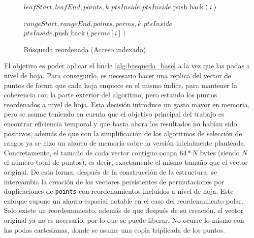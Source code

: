 \begin{figure}[H]
\centering
\begin{minipage}{0.47\textwidth}
\begin{algorithmic}[1]
\Require $\mathit{leafStart}, \mathit{leafEnd}, \mathit{points}, k$
\Ensure $\mathit{ptsInside}$
\Statex
{}
        \State $\mathit{ptsInside}.\text{push\_back}(i)$
    \EndIf
\EndFor
\end{algorithmic}
\caption{Búsqueda base (Acceso secuencial).}
\label{alg:busqueda_base}
\end{minipage}
\hfill
\begin{minipage}{0.49\textwidth}
\begin{algorithmic}[1]
\Require $\mathit{rangeStart}, \mathit{rangeEnd}, \mathit{points}, \mathit{perms}, k$
\Ensure $\mathit{ptsInside}$
\Statex
{}
        \State $\mathit{ptsInside}.\text{push\_back}(\mathit{perms}[i])$
    \EndIf
\EndFor
\end{algorithmic}
\caption{Búsqueda reordenada (Acceso indexado).}
\label{alg:busqueda_reordenada}
\end{minipage}
\end{figure}

El objetivo es poder aplicar el bucle \ref{alg:busqueda_base} a la vez que las podas a nivel de hoja. Para conseguirlo, es necesario hacer una réplica del  vector de puntos de forma que cada hoja empiece en el mismo índice, para mantener la coherencia con la parte exterior del algoritmo, pero estando los puntos reordenados a nivel de hoja. Esta decisión introduce un gasto mayor en memoria, pero se asume teniendo en cuenta que el objetivo principal del trabajo es encontrar eficiencia temporal y que hasta ahora los resultados no habían sido positivos, además de que con la simplificación de los algoritmos de selección de rangos ya se hizo un ahorro de memoria sobre la versión inicialmente planteada. Concretamente, el tamaño de cada vector contiguo ocupa $64*N$ bytes (siendo $N$ el número total de puntos), es decir, exactamente el mismo tamaño que el vector original. De esta forma, después de la construcción de la estructura, se intercambia la creación de los vectores persistentes de permutaciones por duplicaciones de \texttt{points} con reordenamientos incluidos a nivel de hoja. Este enfoque supone un ahorro espacial notable en el caso del reordenamiento polar. Solo existe un reordenamiento, además de que después de su creación, el vector original ya no es necesario, por lo que se puede liberar. No ocurre lo mismo con las podas cartesianas, donde se asume una copia triplicada de los puntos.

